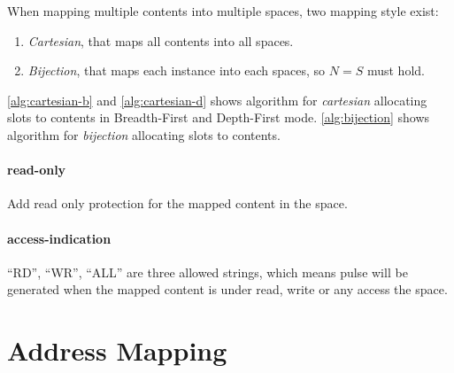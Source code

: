 \documentclass[10pt,oneside]{book}
\begin{document}
When mapping multiple contents into multiple spaces, two mapping style exist:
\begin{enumerate}
\item \emph{Cartesian}, that maps all contents into all spaces. 
\item \emph{Bijection}, that maps each instance into each spaces, so $N=S$ must
  hold. 
\end{enumerate}
\autoref{alg:cartesian-b} and \autoref{alg:cartesian-d}
shows algorithm for \emph{cartesian} allocating 
slots to contents in 
Breadth-First and Depth-First mode. \autoref{alg:bijection} shows algorithm
for \emph{bijection} allocating slots to contents. 


\paragraph{read-only} 
Add read only protection for the mapped content in the space. 

\paragraph{access-indication}
``RD'', ``WR'', ``ALL'' are three allowed strings, which means 
pulse will be generated when the mapped content is under 
read, write or any access the space. 


\section{Address Mapping}
\end{document}
